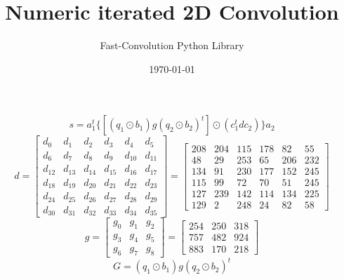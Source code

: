 \documentclass{article}%
\title{Numeric iterated 2D Convolution}%
\author{Fast{-}Convolution Python Library}%
\date{\today}%
\begin{document}
%
\normalsize%
\maketitle%
\[%
s=a_1^t \{[(q_1 \odot b_1) g (q_2 \odot b_2)^t] \odot (c_1^t d c_2)\}a_2%
\]%
\[%
d = \left[\begin{matrix}d_{0} & d_{1} & d_{2} & d_{3} & d_{4} & d_{5}\\d_{6} & d_{7} & d_{8} & d_{9} & d_{10} & d_{11}\\d_{12} & d_{13} & d_{14} & d_{15} & d_{16} & d_{17}\\d_{18} & d_{19} & d_{20} & d_{21} & d_{22} & d_{23}\\d_{24} & d_{25} & d_{26} & d_{27} & d_{28} & d_{29}\\d_{30} & d_{31} & d_{32} & d_{33} & d_{34} & d_{35}\end{matrix}\right] = \left[\begin{matrix}208 & 204 & 115 & 178 & 82 & 55\\48 & 29 & 253 & 65 & 206 & 232\\134 & 91 & 230 & 177 & 152 & 245\\115 & 99 & 72 & 70 & 51 & 245\\127 & 239 & 142 & 114 & 134 & 225\\129 & 2 & 248 & 24 & 82 & 58\end{matrix}\right]%
\]%
\[%
g = \left[\begin{matrix}g_{0} & g_{1} & g_{2}\\g_{3} & g_{4} & g_{5}\\g_{6} & g_{7} & g_{8}\end{matrix}\right] = \left[\begin{matrix}254 & 250 & 318\\757 & 482 & 924\\883 & 170 & 218\end{matrix}\right]%
\]%
\[%
G = (q_1 \odot b_1) g (q_2 \odot b_2)^t%
\]%
\end{document}
